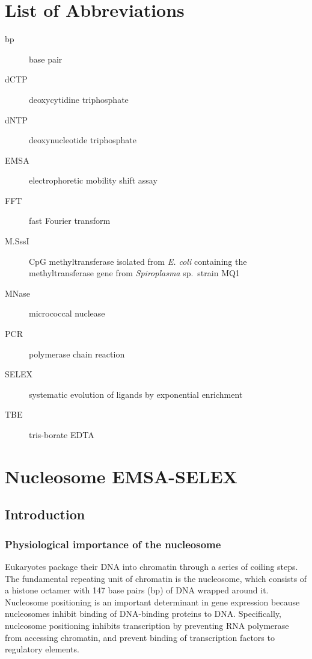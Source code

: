 \documentclass[parskip=full, numbers=noenddot]{scrbook}
\begin{document}
\tableofcontents

\chapter*{List of Abbreviations}
\label{ch:abbrev}

\begin{description}
\item [bp] base pair
\item [dCTP] deoxycytidine triphosphate
\item [dNTP] deoxynucleotide triphosphate
\item [EMSA] electrophoretic mobility shift assay
\item [FFT] fast Fourier transform
\item [M.SssI] CpG methyltransferase isolated from \emph{E. coli} containing the methyltransferase gene from \emph{Spiroplasma} sp.\ strain MQ1
\item [MNase] micrococcal nuclease
\item [PCR] polymerase chain reaction
\item [SELEX] systematic evolution of ligands by exponential enrichment
\item [TBE] tris-borate EDTA
\end{description}

\mainmatter

\chapter{Nucleosome EMSA-SELEX}
\label{ch:emsaselex}

\section{Introduction}
\label{sec:emsaselex_intro}

\subsection{Physiological importance of the nucleosome}
\label{ssec:emsaselex_intro_importance}

Eukaryotes package their DNA into chromatin through a series of coiling steps.  The fundamental repeating unit of chromatin is the nucleosome, which consists of a histone octamer with 147 base pairs (bp) of DNA wrapped around it.  Nucleosome positioning is an important determinant in gene expression because nucleosomes inhibit binding of DNA-binding proteins to DNA.  Specifically, nucleosome positioning inhibits transcription by preventing RNA polymerase from accessing chromatin, and prevent binding of transcription factors to regulatory elements.
\end{document}
